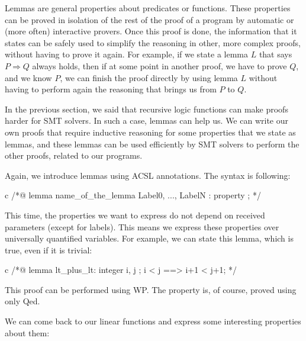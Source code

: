 Lemmas are general properties about predicates or functions. These properties
can be proved in isolation of the rest of the proof of a program by automatic or
(more often) interactive provers. Once this proof is done, the information that
it states can be safely used to simplify the reasoning in other, more complex
proofs, without having to prove it again. For example, if we state a lemma $L$
that says $P \Rightarrow Q$ always holds, then if at some point in another proof, we
have to prove $Q$, and we know $P$, we can finish the proof directly by using lemma
$L$ without having to perform again the reasoning that brings us from $P$ to
$Q$.


In the previous section, we said that recursive logic functions can make proofs harder
for SMT solvers. In such a case, lemmas can help us. We can write our own
proofs that require inductive reasoning for some properties that we state as
lemmas, and these lemmas can be used efficiently by SMT solvers to perform the
other proofs, related to our programs.




Again, we introduce lemmas using ACSL annotations. The syntax is
following:



\begin{CodeBlock}{c}
/*@
  lemma name_of_the_lemma { Label0, ..., LabelN }:
    property ;
*/
\end{CodeBlock}



This time, the properties we want to express do not depend on received
parameters (except for labels). This means we express these properties over universally
quantified variables. For example, we can state this lemma, which is true, even
if it is trivial:



\begin{CodeBlock}{c}
/*@
  lemma lt_plus_lt:
    \forall integer i, j ; i < j ==> i+1 < j+1;
*/
\end{CodeBlock}



This proof can be performed using WP. The property is, of course, proved
using only Qed.





We can come back to our linear functions and express some interesting
properties about them:



